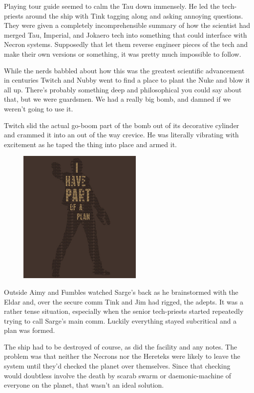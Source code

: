 Playing tour guide seemed to calm the Tau down immensely. 
He led the tech-priests around the ship with Tink tagging along and asking annoying questions. 
They were given a completely incomprehensible summary of how the scientist had merged Tau, Imperial, and Jokaero tech into something that could interface with Necron systems. 
Supposedly that let them reverse engineer pieces of the tech and make their own versions or something, it was pretty much impossible to follow.

While the nerds babbled about how this was the greatest scientific advancement in centuries Twitch and Nubby went to find a place to plant the Nuke and blow it all up. 
There's probably something deep and philosophical you could say about that, but we were guardsmen. 
We had a really big bomb, and damned if we weren't going to use it. 


Twitch slid the actual go-boom part of the bomb out of its decorative cylinder and crammed it into an out of the way crevice. 
He was literally vibrating with excitement as he taped the thing into place and armed it.

\begin{figure}
	\begin{center}
		\includegraphics[width=\figwidth]{pics/11/84.png}
	\end{center}
\end{figure}
Outside Aimy and Fumbles watched Sarge's back as he brainstormed with the Eldar and, over the secure comm Tink and Jim had rigged, the adepts. 
It was a rather tense situation, especially when the senior tech-priests started repeatedly trying to call Sarge's main comm. 
Luckily everything stayed subcritical and a plan was formed.

The ship had to be destroyed of course, as did the facility and any notes. 
The problem was that neither the Necrons nor the Hereteks were likely to leave the system until they'd checked the planet over themselves. 
Since that checking would doubtless involve the death by scarab swarm or daemonic-machine of everyone on the planet, that wasn't an ideal solution.

